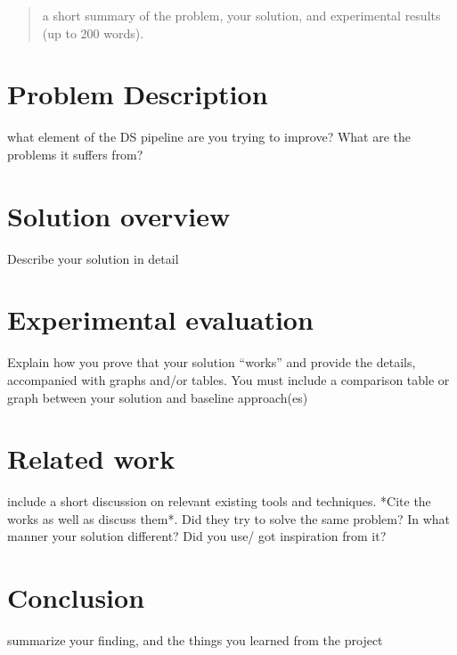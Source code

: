 \documentclass[12pt]{article}
\begin{document}
\maketitle

\begin{abstract}
a short summary of the problem, your solution, and experimental results (up to 200 words).
\end{abstract}

\section{Problem Description}\label{Problem Description}
what element of the DS pipeline are you trying to
improve? What are the problems it suffers from? 

\section{Solution overview}\label{Solution overview}
Describe your solution in detail

\section{Experimental evaluation}\label{Experimental evaluation}
Explain how you prove that your solution
“works” and provide the details, accompanied with graphs and/or tables.
You must include a comparison table or graph between your solution and
baseline approach(es)

\section{Related work}\label{Related work}
include a short discussion on relevant existing tools and
techniques. *Cite the works as well as discuss them*. Did they try to
solve the same problem? In what manner your solution different? Did
you use/ got inspiration from it? 

\section{Conclusion}\label{Conclusion}
summarize your finding, and the things you learned from
the project



\end{document}
